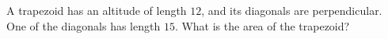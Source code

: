 A trapezoid has an altitude of length $12$, and its diagonals are perpendicular. One of the diagonals has length $15$. What is the area of the trapezoid?
